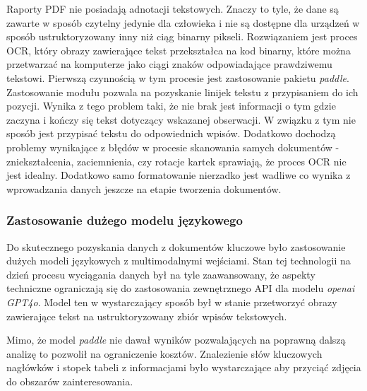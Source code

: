 Raporty \ac{PDF} nie posiadają adnotacji tekstowych. 
Znaczy to tyle, że dane są zawarte w sposób czytelny
jedynie dla człowieka i nie są dostępne dla urządzeń w sposób
ustruktoryzowany inny niż ciąg binarny pikseli.
Rozwiązaniem jest proces \ac{OCR}, który obrazy zawierające tekst
przekształca na kod binarny, które można przetwarzać na komputerze
jako ciągi znaków odpowiadające prawdziwemu tekstowi. Pierwszą
czynnością w tym procesie jest zastosowanie pakietu \textit{paddle}.
Zastosowanie modułu pozwala na pozyskanie linijek tekstu z przypisaniem
do ich pozycji. Wynika z tego problem taki, że nie brak jest informacji
o tym gdzie zaczyna i kończy się tekst dotyczący wskazanej obserwacji.
W związku z tym nie sposób jest przypisać tekstu do odpowiednich
wpisów. Dodatkowo dochodzą problemy wynikające z błędów w procesie
skanowania samych dokumentów - zniekształcenia, zaciemnienia, czy
rotacje kartek sprawiają, że proces \ac{OCR} nie jest idealny.
Dodatkowo samo formatowanie nierzadko jest wadliwe co wynika
z wprowadzania danych jeszcze na etapie tworzenia dokumentów.



\subsubsection{Zastosowanie dużego modelu językowego}

Do skutecznego pozyskania danych z dokumentów kluczowe było zastosowanie
dużych modeli językowych z multimodalnymi wejściami. Stan tej technologii
na dzień procesu wyciągania danych był na tyle zaawansowany, że
aspekty techniczne ograniczają się do zastosowania zewnętrznego \ac{API}
dla modelu \textit{openai} \textit{GPT4o}. Model ten w wystarczający
sposób był w stanie przetworzyć obrazy zawierające tekst na ustruktoryzowany
zbiór wpisów tekstowych.

Mimo, że model \textit{paddle} nie dawał wyników pozwalających na
poprawną dalszą analizę to pozwolił na ograniczenie kosztów. Znalezienie
słów kluczowych nagłówków i stopek tabeli z informacjami było wystarczające
aby przyciąć zdjęcia do obszarów zainteresowania.
